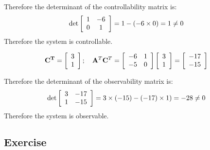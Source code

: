 Therefore the determinant of the controllability matrix is:
\[
\det \left[ {\begin{array}{*{20}c}
   1 & { - 6}  \\
   0 & 1  \\
\end{array}} \right] = 1 - ( - 6 \times 0) = 1 \ne 0
\]
Therefore the system is controllable.
 
\[
{\bf{C}^T} = \left[ {\begin{array}{*{20}c}
   3  \\
   1  \\
\end{array}} \right];\quad {\bf A}^T{\bf C}^T = \left[ {\begin{array}{*{20}c}
   { - 6} & { 1 }  \\
   {-5} & 0  \\
\end{array}} \right]\left[ {\begin{array}{*{20}c}
   3  \\
   1  \\
\end{array}} \right] = \left[ {\begin{array}{*{20}c}
   { -17 }  \\
   { -15 }  \\
\end{array}} \right]
\]

Therefore the determinant of the observability matrix is:
\[
\det \left[ {\begin{array}{*{20}c}
   3 & { -17 }  \\
   1 & { -15 }  \\
\end{array}} \right] = 3\times(-15) - (-17) \times 1) = -28 \ne 0
\]
Therefore the system is observable.


\subsection*{Exercise} %
\label{sub:exercise}

